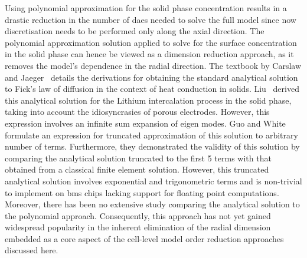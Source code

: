 Using polynomial  approximation for the  solid phase concentration results  in a
drastic reduction  in the number  of \gls{dae}s needed  to solve the  full model
since now discretisation  needs to be performed only along  the axial direction.
The  polynomial  approximation  solution  applied   to  solve  for  the  surface
concentration in  the solid phase can  hence be viewed as  a dimension reduction
approach, as  it removes  the model's  dependence in  the radial  direction. The
textbook by  Carslaw and  Jaeger~\cite{Carslaw1947} details the  derivations for
obtaining the  standard analytical solution  to Fick's  law of diffusion  in the
context of heat conduction in solids. Liu~\cite{Liu2006} derived this analytical
solution for the  Lithium intercalation process in the solid  phase, taking into
account  the  idiosyncrasies  of porous  electrodes. However, this  expression involves an  infinite sum
expansion of eigen  modes. Guo and White~\cite{Guo2012}  formulate an expression
for  truncated approximation  of this  solution  to arbitrary  number of  terms.
Furthermore, they  demonstrated the validity  of this solution by  comparing the
analytical solution  truncated to the  first 5 terms  with that obtained  from a
classical finite  element solution. However, this  truncated analytical solution
involves exponential and trigonometric terms  and is non-trivial to implement on
\gls{bms} chips lacking support for floating point computations. Moreover, there
has been no extensive study comparing  the analytical solution to the polynomial
approach. Consequently, this  approach has not yet  gained widespread popularity
in the inherent elimination of the radial dimension embedded as a core aspect of
the  cell-level model  order reduction  approaches discussed  here.


